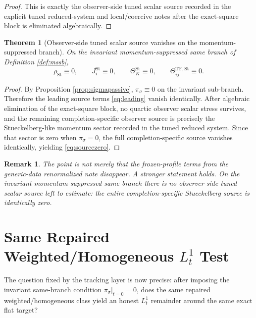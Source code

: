 \documentclass[11pt]{article}
\newtheorem{remark}{Remark}
\newtheorem{theorem}{Theorem}
\begin{document}
\begin{proof}
This is exactly the observer-side tuned scalar source recorded in the explicit tuned reduced-system and local/coercive notes after the exact-square block is eliminated algebraically.
\end{proof}

\begin{theorem}[Observer-side tuned scalar source vanishes on the momentum-suppressed branch]
\label{thm:sourcezero}
On the invariant momentum-suppressed same branch of Definition \ref{def:mssb},
\begin{equation}
\rho_{\mathrm{St}}\equiv 0,
\qquad
J_i^{\mathrm{St}}\equiv 0,
\qquad
\Theta_K^{\mathrm{St}}\equiv 0,
\qquad
\Theta_{ij}^{\mathrm{TF,St}}\equiv 0.
\label{eq:sourcezero}
\end{equation}
\end{theorem}

\begin{proof}
By Proposition \ref{prop:sigmapassive}, \(\pi_\sigma\equiv 0\) on the invariant sub-branch. Therefore the leading source terms \eqref{eq:leading} vanish identically. After algebraic elimination of the exact-square block, no quartic observer scalar stress survives, and the remaining completion-specific observer source is precisely the Stueckelberg-like momentum sector recorded in the tuned reduced system. Since that sector is zero when \(\pi_\sigma=0\), the full completion-specific source vanishes identically, yielding \eqref{eq:sourcezero}.
\end{proof}

\begin{remark}
The point is not merely that the frozen-profile terms from the generic-data renormalized note disappear. A stronger statement holds. On the invariant momentum-suppressed same branch there is no observer-side tuned scalar source left to estimate: the entire completion-specific Stueckelberg source is identically zero.
\end{remark}

\section{Same Repaired Weighted/Homogeneous \texorpdfstring{\(L_t^1\)}{L1-in-time} Test}

The question fixed by the tracking layer is now precise: after imposing the invariant same-branch condition \(\pi_\sigma|_{t=0}=0\), does the same repaired weighted/homogeneous class yield an honest \(L_t^1\) remainder around the same exact flat target?
\end{document}
